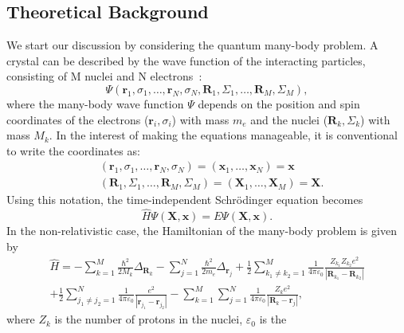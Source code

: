 \begin{refsection}
\newpage 
 
\section{Theoretical Background} \label{dft:sec-theory} 
 
We start our discussion by considering the quantum many-body problem. A 
crystal can be described by the wave function of the interacting particles, 
consisting of M nuclei and N electrons~\cite{Springborg2017}: 
\begin{equation} 
 \Psi (\mathbf{r}_1, \sigma_1, \hdots,\mathbf{r}_N, \sigma_N, \mathbf{R}_1, 
\Sigma_1, \hdots, \mathbf{R}_M, \Sigma_M), 
\end{equation} 
where the many-body wave function $\Psi$ depends on the position and spin 
coordinates of the electrons ($\mathbf{r}_i,\sigma_i$) with mass $m_e$ and the 
nuclei ($\mathbf{R}_k,\Sigma_k$) with mass $M_k$. In the interest of making 
the equations manageable, it is conventional to write the coordinates as: 
\begin{eqnarray*} 
&(\mathbf{r}_1, \sigma_1, \hdots,\mathbf{r}_N, \sigma_N) = 
(\mathbf{x}_1,\hdots , \mathbf{x}_N) = \mathbf{x} 
\\&(\mathbf{R}_1, \Sigma_1, \hdots, \mathbf{R}_M, \Sigma_M) = 
(\mathbf{X}_1,\hdots , \mathbf{X}_M) = \mathbf{X}. 
\end{eqnarray*} 
Using this notation, the time-independent Schr\"odinger equation becomes 
\begin{equation} 
\hat{H} \Psi (\mathbf{X}, \mathbf{x}) = E \Psi (\mathbf{X}, \mathbf{x}). 
\end{equation} 
In the non-relativistic case, the 
Hamiltonian of the many-body problem is given by 
\begin{equation} 
\begin{gathered} 
\hat{H}=-\sum_{k=1}^M \frac{\hbar^2}{2M_k}\Delta_{\mathbf{R}_k}-\sum_{j=1}^N 
\frac{\hbar^2}{2m_e} \Delta_{\mathbf{r}_j} + \frac{1}{2} \sum_{k_1 \neq k_2 = 
1}^M \frac{1}{4 \pi \varepsilon_0} \frac{Z_{k_1} Z_{k_2} e^2 
}{|\mathbf{R}_{k_1}-\mathbf{R}_{k_2}|} \\ + \frac{1}{2} \sum_{j_1 \neq j_2 = 
1}^N \frac{1}{4 \pi \varepsilon_0} \frac{e^2 
}{|\mathbf{r}_{j_1}-\mathbf{r}_{j_2}|} - \sum_{k=1}^M \sum_{j=1}^N  \frac{1}{4 
\pi \varepsilon_0} \frac{Z_k e^2 }{|\mathbf{R}_{k}-\mathbf{r}_{j}|}, 
\end{gathered} 
\end{equation} 
where $Z_k$ is the number of protons in the nuclei, $\varepsilon_0$ is the 

\end{refsection}
